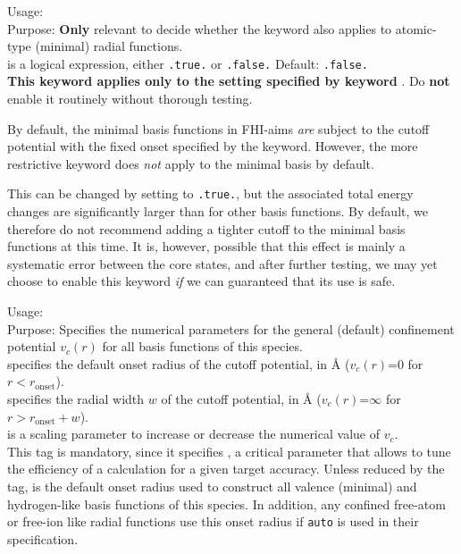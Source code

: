 {
  \noindent
  Usage:   \\[1.0ex]
  Purpose: \textbf{Only} relevant to decide whether the
     keyword also applies to
    atomic-type (minimal) radial functions. \\[1.0ex]
   is a logical expression, either \texttt{.true.} or
    \texttt{.false.} Default: \texttt{.false.} \\
}
\textbf{This keyword applies only to the setting specified by keyword}
. Do \textbf{not} enable it
routinely without thorough testing.

By default, the minimal basis functions in FHI-aims \emph{are} subject
to the cutoff potential with the fixed onset specified by the
 keyword. However, the more restrictive
 keyword does \emph{not} apply
to the minimal basis by default.

This can be changed by setting
 to \texttt{.true.}, but the
associated total energy changes are significantly larger than for
other basis functions. By default, we therefore do not recommend
adding a tighter cutoff to the minimal basis functions at this
time. It is, however, possible that this effect is mainly a systematic
error between the core states, and after further testing, we may yet
choose to enable this keyword \emph{if} we can guaranteed that its
use is safe.

{
  \noindent
  Usage:   
     \\[1.0ex]
  Purpose: Specifies the numerical parameters for the general
    (default) confinement potential $v_c(r)$ for all basis functions of this
    species. \\[1.0ex]
   specifies the default onset radius of the cutoff
    potential, in {\AA} ($v_c(r)$=0 for $r<r_\text{onset}$). \\
   specifies the radial width $w$ of the cutoff potential,
    in {\AA} ($v_c(r)$=$\infty$ for $r>r_\text{onset}+w$). \\
   is a scaling parameter to increase or decrease the
    numerical value of $v_c$. \\
}
This tag is mandatory, since it specifies , a critical
parameter that allows to tune the efficiency of a calculation for
a given target 
accuracy. Unless reduced by the
 tag,  is the
default onset radius used to construct all valence (minimal) and
hydrogen-like basis functions of this species. In addition, any
confined free-atom or free-ion like radial functions use this onset
radius if \texttt{auto} is used in their specification.

